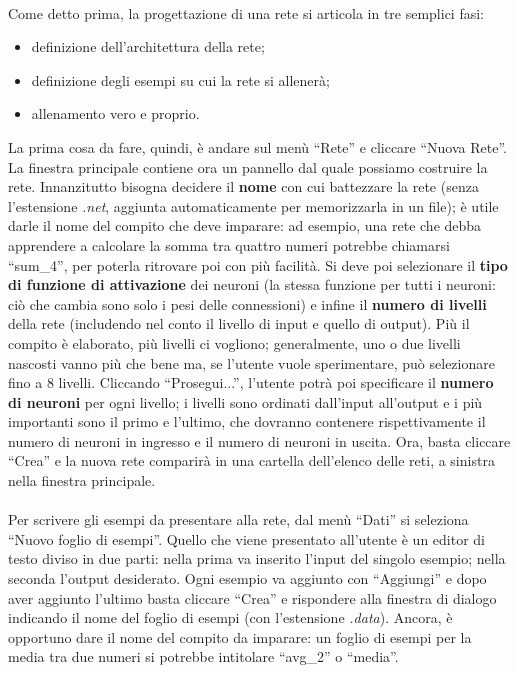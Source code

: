 \documentclass[12pt]{article}
\begin{document}
\paragraph{} Come detto prima, la progettazione di una rete si articola in tre semplici fasi:
\begin{itemize}
	\item definizione dell'architettura della rete;
	\item definizione degli esempi su cui la rete si allenerà;
	\item allenamento vero e proprio.
\end{itemize}
La prima cosa da fare, quindi, è andare sul menù “Rete” e cliccare “Nuova Rete”. La finestra principale contiene ora un pannello dal quale possiamo costruire la rete. Innanzitutto bisogna decidere il \textbf{nome} con cui battezzare la rete (senza l'estensione \textit{.net}, aggiunta automaticamente per memorizzarla in un file); è utile darle il nome del compito che deve imparare: ad esempio, una rete che debba apprendere a calcolare la somma tra quattro numeri potrebbe chiamarsi “sum\_4”, per poterla ritrovare poi con più facilità. Si deve poi selezionare il \textbf{tipo di funzione di attivazione} dei neuroni (la stessa funzione per tutti i neuroni: ciò che cambia sono solo i pesi delle connessioni) e infine il \textbf{numero di livelli} della rete (includendo nel conto il livello di input e quello di output). Più il compito è elaborato, più livelli ci vogliono; generalmente, uno o due livelli nascosti vanno più che bene ma, se l'utente vuole sperimentare, può selezionare fino a 8 livelli. Cliccando “Prosegui...”, l'utente potrà poi specificare il \textbf{numero di neuroni} per ogni livello; i livelli sono ordinati dall'input all'output e i più importanti sono il primo e l'ultimo, che dovranno contenere rispettivamente il numero di neuroni in ingresso e il numero di neuroni in uscita. Ora, basta cliccare “Crea” e la nuova rete comparirà in una cartella dell'elenco delle reti, a sinistra nella finestra principale.

\paragraph{} Per scrivere gli esempi da presentare alla rete, dal menù “Dati” si seleziona “Nuovo foglio di esempi”. Quello che viene presentato all'utente è un editor di testo diviso in due parti: nella prima va inserito l'input del singolo esempio; nella seconda l'output desiderato. Ogni esempio va aggiunto con “Aggiungi” e dopo aver aggiunto l'ultimo basta cliccare “Crea” e rispondere alla finestra di dialogo indicando il nome del foglio di esempi (con l'estensione \textit{.data}). Ancora, è opportuno dare il nome del compito da imparare: un foglio di esempi per la media tra due numeri si potrebbe intitolare “avg\_2” o “media”.
\end{document}
